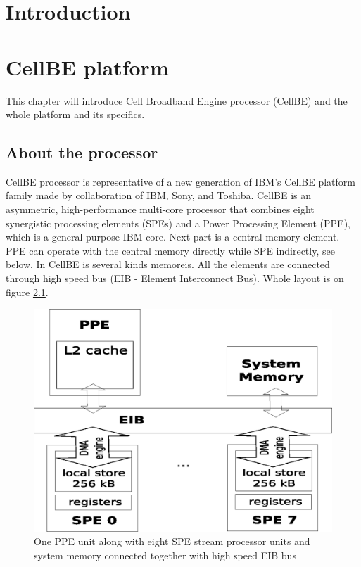 \chapter{Introduction}

\chapter{CellBE platform}

This chapter will introduce Cell Broadband Engine processor (CellBE) and the whole platform and its specifics.

\section{About the processor}

CellBE processor is representative of a new generation of IBM's CellBE platform family made by collaboration of IBM, Sony, and Toshiba.
CellBE is an asymmetric, high-performance multi-core processor that combines eight synergistic processing elements (SPEs) and a Power Processing Element (PPE), which is a general-purpose IBM  core.
Next part is a central memory element.
PPE can operate with the central memory directly while SPE indirectly, see below.
In CellBE is several kinds memoreis.
All the elements are connected through high speed bus (EIB - Element Interconnect Bus).
Whole layout is on figure \ref{fg:processorLayout}.

\begin{figure}
    \centering
    \includegraphics[width=\textwidth]{data/cellLayout}
    \caption[CellBE processor layout]{One PPE unit along with eight SPE stream processor units and system memory connected together with high speed EIB bus}
    \label{fg:processorLayout}
\end{figure}

